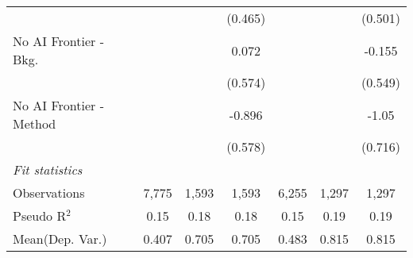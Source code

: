 \begin{tabular}{lcccccc}
                           &              &              & (0.465)      &              &         & (0.501)\\   
   No AI Frontier - Bkg.   &              &              & 0.072        &              &         & -0.155\\   
                           &              &              & (0.574)      &              &         & (0.549)\\   
   No AI Frontier - Method &              &              & -0.896       &              &         & -1.05\\   
                           &              &              & (0.578)      &              &         & (0.716)\\   
   \midrule
   \emph{Fit statistics}\\
   Observations            & 7,775        & 1,593        & 1,593        & 6,255        & 1,297   & 1,297\\  
   Pseudo R$^2$            & 0.15         & 0.18         & 0.18         & 0.15         & 0.19    & 0.19\\  
Mean(Dep. Var.) & 0.407 & 0.705 & 0.705 & 0.483 & 0.815 & 0.815 \\
   

\end{tabular}
